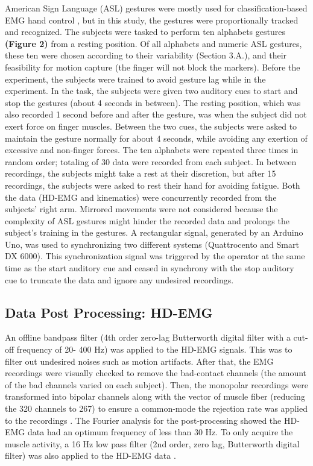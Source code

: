 \documentclass[conference]{IEEEtran}
\begin{document}
American Sign Language (ASL) gestures were mostly used for classification-based EMG hand control 
\cite{b27}, but in this study, the gestures were proportionally tracked and recognized. The subjects were tasked to 
perform ten alphabets gestures \textbf{(Figure 2)} from a resting position. Of all alphabets and numeric ASL gestures, 
these ten were chosen according to their variability \cite{b28} (Section 3.A.), and their feasibility for motion 
capture (the finger will not block the markers). Before the experiment, the subjects were trained to avoid 
gesture lag while in the experiment. In the task, the subjects were given two auditory cues to start and stop 
the gestures (about 4 seconds in between). The resting position, which was also recorded 1 second before 
and after the gesture, was when the subject did not exert force on finger muscles. Between the two cues, the 
subjects were asked to maintain the gesture normally for about 4 seconds, while avoiding any exertion of 
excessive and non-finger forces. The ten alphabets were repeated three times in random order; totaling of 
30 data were recorded from each subject. In between recordings, the subjects might take a rest at their 
discretion, but after 15 recordings, the subjects were asked to rest their hand for avoiding fatigue.
Both the data (HD-EMG and kinematics) were concurrently recorded from the subjects’ right arm. 
Mirrored movements \cite{b9} were not considered because the complexity of ASL gestures might hinder the 
recorded data and prolongs the subject’s training in the gestures. A rectangular signal, generated by an 
Arduino Uno, was used to synchronizing two different systems (Quattrocento and Smart DX 6000). This 
synchronization signal was triggered by the operator at the same time as the start auditory cue and ceased 
in synchrony with the stop auditory cue to truncate the data and ignore any undesired recordings.

\subsection{Data Post Processing: HD-EMG}
An offline bandpass filter (4th order zero-lag Butterworth digital filter with a cut-off frequency of 20-
400 Hz) was applied to the HD-EMG signals. This was to filter out undesired noises such as motion artifacts. 
After that, the EMG recordings were visually checked to remove the bad-contact channels (the amount of 
the bad channels varied on each subject). Then, the monopolar recordings were transformed into bipolar 
channels along with the vector of muscle fiber (reducing the 320 channels to 267) to ensure a common-mode 
the rejection rate was applied to the recordings \cite{b9}. The Fourier analysis for the post-processing showed the HD-EMG data had an optimum frequency of less than 30 Hz. To only acquire the muscle activity, a 
16 Hz low pass filter (2nd order, zero lag, Butterworth digital filter) was also applied to the HD-EMG data 
\cite{b9}\cite{b29}.
\end{document}
